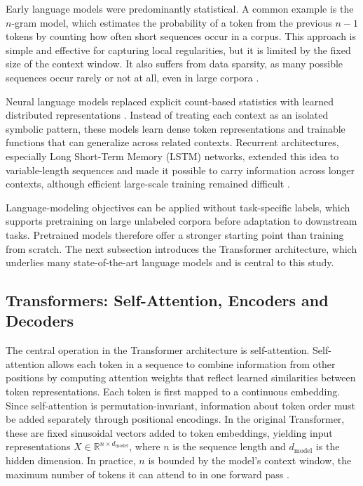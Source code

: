 Early language models were predominantly statistical. A common example is the
$n$-gram model, which estimates the probability of a token from the previous
$n-1$ tokens by counting how often short sequences occur in a corpus. This
approach is simple and effective for capturing local regularities, but it is
limited by the fixed size of the context window. It also suffers from data
sparsity, as many possible sequences occur rarely or not at all, even in
large corpora \citep{880083,Jelinek1997StatisticalMF}.

Neural language models replaced explicit count-based statistics with learned
distributed representations \citep{10.5555/944919.944966}. Instead of treating
each context as an isolated symbolic pattern, these models learn dense token
representations and trainable functions that can generalize across related
contexts. Recurrent architectures, especially Long Short-Term Memory (LSTM)
networks, extended this idea to variable-length sequences and made it possible
to carry information across longer contexts, although efficient large-scale
training remained difficult \citep{Mikolov2010RecurrentNN}.

Language-modeling objectives can be applied without task-specific labels, which
supports pretraining on large unlabeled corpora before adaptation to downstream
tasks. Pretrained models therefore offer a stronger starting point than training
from scratch. The next subsection introduces the Transformer architecture, which
underlies many state-of-the-art language models and is central to this study.

\subsection{Transformers: Self-Attention, Encoders and Decoders}
\label{sec:transformers}

The central operation in the Transformer architecture is self-attention.
Self-attention allows each token in a sequence to combine information from
other positions by computing attention weights that reflect learned similarities
between token representations. Each token is first mapped to a continuous
embedding. Since self-attention is permutation-invariant, information about
token order must be added separately through positional encodings. In the
original Transformer, these are fixed sinusoidal vectors added to token
embeddings, yielding input representations
$X \in \mathbb{R}^{n \times d_{\text{model}}}$, where $n$ is the sequence
length and $d_{\text{model}}$ is the hidden dimension. In practice, $n$ is
bounded by the model's context window, the maximum number of tokens it can
attend to in one forward pass \citep{NIPS2017_3f5ee243}.

